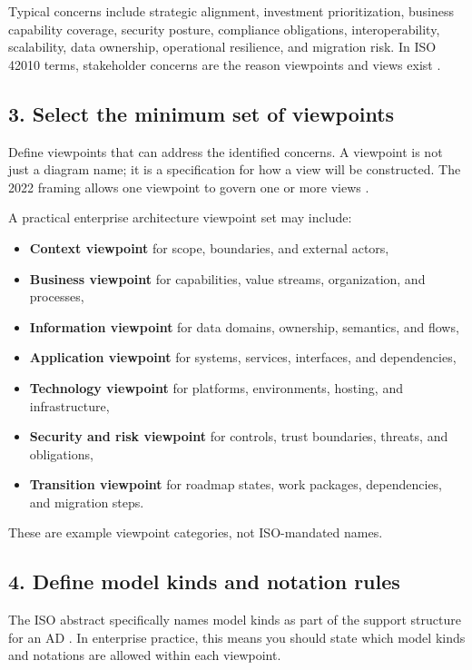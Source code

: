 \documentclass[11pt]{article}
\begin{document}
Typical concerns include strategic alignment, investment prioritization, business capability coverage, security posture, compliance obligations, interoperability, scalability, data ownership, operational resilience, and migration risk. In ISO 42010 terms, stakeholder concerns are the reason viewpoints and views exist \cite{cm42010}.

\subsection*{3. Select the minimum set of viewpoints}
Define viewpoints that can address the identified concerns. A viewpoint is not just a diagram name; it is a specification for how a view will be constructed. The 2022 framing allows one viewpoint to govern one or more views \cite{nora42010}.

A practical enterprise architecture viewpoint set may include:
\begin{itemize}
    \item \textbf{Context viewpoint} for scope, boundaries, and external actors,
    \item \textbf{Business viewpoint} for capabilities, value streams, organization, and processes,
    \item \textbf{Information viewpoint} for data domains, ownership, semantics, and flows,
    \item \textbf{Application viewpoint} for systems, services, interfaces, and dependencies,
    \item \textbf{Technology viewpoint} for platforms, environments, hosting, and infrastructure,
    \item \textbf{Security and risk viewpoint} for controls, trust boundaries, threats, and obligations,
    \item \textbf{Transition viewpoint} for roadmap states, work packages, dependencies, and migration steps.
\end{itemize}

These are example viewpoint categories, not ISO-mandated names.

\subsection*{4. Define model kinds and notation rules}
The ISO abstract specifically names model kinds as part of the support structure for an AD \cite{iso42010}. In enterprise practice, this means you should state which model kinds and notations are allowed within each viewpoint.
\end{document}
